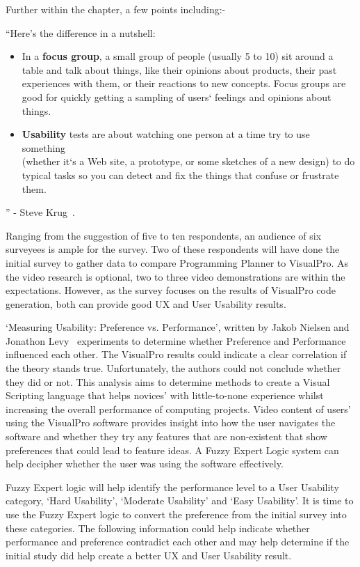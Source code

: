 \documentclass[12pt]{report} %
\begin{document}
	Further within the chapter, a few points including:-
	\begin{center}
		``Here's the difference in a nutshell:
		\begin{itemize}
			\item In a \textbf{focus group}, a small group of people (usually 5 to 10) sit around a table and talk about things, like their opinions about products, their past experiences with them, or their reactions to new concepts. Focus groups are good for quickly getting a sampling of users` feelings and opinions about things.
			\item \textbf{Usability} tests are about watching one person at a time try to use something\\(whether it`s a Web site, a prototype, or some sketches of a new design) to do typical tasks so you can detect and fix the things that confuse or frustrate them.
		\end{itemize}
		'' - Steve Krug~\cite{krug_steve_dont_2014}.
	\end{center}

	Ranging from the suggestion of five to ten respondents, an audience of six surveyees is ample for the survey. Two of these respondents will have done the initial survey to gather data to compare Programming Planner to VisualPro. As the video research is optional, two to three video demonstrations are within the expectations. However, as the survey focuses on the results of VisualPro code generation, both can provide good UX and User Usability results.

	`Measuring Usability: Preference vs. Performance', written by Jakob Nielsen and Jonathon Levy~\cite{nielsen_measuring_1994} experiments to determine whether Preference and Performance influenced each other. The VisualPro results could indicate a clear correlation if the theory stands true.
	Unfortunately, the authors could not conclude whether they did or not. This analysis aims to determine methods to create a Visual Scripting language that helps novices' with little-to-none experience whilst increasing the overall performance of computing projects. Video content of users' using the VisualPro software provides insight into how the user navigates the software and whether they try any features that are non-existent that show preferences that could lead to feature ideas. A Fuzzy Expert Logic system can help decipher whether the user was using the software effectively.

    Fuzzy Expert logic will help identify the performance level to a User Usability category, `Hard Usability', `Moderate Usability' and `Easy Usability'. It is time to use the Fuzzy Expert logic to convert the preference from the initial survey into these categories. The following information could help indicate whether performance and preference contradict each other and may help determine if the initial study did help create a better UX and User Usability result. 
\end{document}
